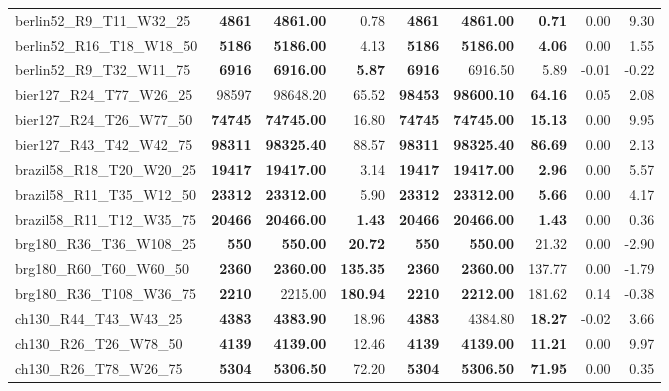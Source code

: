 \documentclass{singlecol-new}
\begin{document}
\begin{scriptsize}
\begin{longtable}{lrrrrrrrr}
		berlin52\_R9\_T11\_W32\_25 & \textbf{4861} & \textbf{4861.00} & 0.78 & \textbf{4861} & \textbf{4861.00} & \textbf{0.71} & 0.00 & 9.30 \\
		berlin52\_R16\_T18\_W18\_50 & \textbf{5186} & \textbf{5186.00} & 4.13 & \textbf{5186} & \textbf{5186.00} & \textbf{4.06} & 0.00 & 1.55 \\
		berlin52\_R9\_T32\_W11\_75 & \textbf{6916} & \textbf{6916.00} & \textbf{5.87} & \textbf{6916} & 6916.50 & 5.89 & -0.01 & -0.22 \\
		bier127\_R24\_T77\_W26\_25 & 98597 & 98648.20 & 65.52 & \textbf{98453} & \textbf{98600.10} & \textbf{64.16} & 0.05 & 2.08 \\
		bier127\_R24\_T26\_W77\_50 & \textbf{74745} & \textbf{74745.00} & 16.80 & \textbf{74745} & \textbf{74745.00} & \textbf{15.13} & 0.00 & 9.95 \\
		bier127\_R43\_T42\_W42\_75 & \textbf{98311} & \textbf{98325.40} & 88.57 & \textbf{98311} & \textbf{98325.40} & \textbf{86.69} & 0.00 & 2.13 \\
		brazil58\_R18\_T20\_W20\_25 & \textbf{19417} & \textbf{19417.00} & 3.14 & \textbf{19417} & \textbf{19417.00} & \textbf{2.96} & 0.00 & 5.57 \\
		brazil58\_R11\_T35\_W12\_50 & \textbf{23312} & \textbf{23312.00} & 5.90 & \textbf{23312} & \textbf{23312.00} & \textbf{5.66} & 0.00 & 4.17 \\
		brazil58\_R11\_T12\_W35\_75 & \textbf{20466} & \textbf{20466.00} & \textbf{1.43} & \textbf{20466} & \textbf{20466.00} & \textbf{1.43} & 0.00 & 0.36 \\
		brg180\_R36\_T36\_W108\_25 & \textbf{550} & \textbf{550.00} & \textbf{20.72} & \textbf{550} & \textbf{550.00} & 21.32 & 0.00 & -2.90 \\
		brg180\_R60\_T60\_W60\_50 & \textbf{2360} & \textbf{2360.00} & \textbf{135.35} & \textbf{2360} & \textbf{2360.00} & 137.77 & 0.00 & -1.79 \\
		brg180\_R36\_T108\_W36\_75 & \textbf{2210} & 2215.00 & \textbf{180.94} & \textbf{2210} & \textbf{2212.00} & 181.62 & 0.14 & -0.38 \\
		ch130\_R44\_T43\_W43\_25 & \textbf{4383} & \textbf{4383.90} & 18.96 & \textbf{4383} & 4384.80 & \textbf{18.27} & -0.02 & 3.66 \\
		ch130\_R26\_T26\_W78\_50 & \textbf{4139} & \textbf{4139.00} & 12.46 & \textbf{4139} & \textbf{4139.00} & \textbf{11.21} & 0.00 & 9.97 \\
		ch130\_R26\_T78\_W26\_75 & \textbf{5304} & \textbf{5306.50} & 72.20 & \textbf{5304} & \textbf{5306.50} & \textbf{71.95} & 0.00 & 0.35 \\

\end{longtable}
\end{scriptsize}
\end{document}
